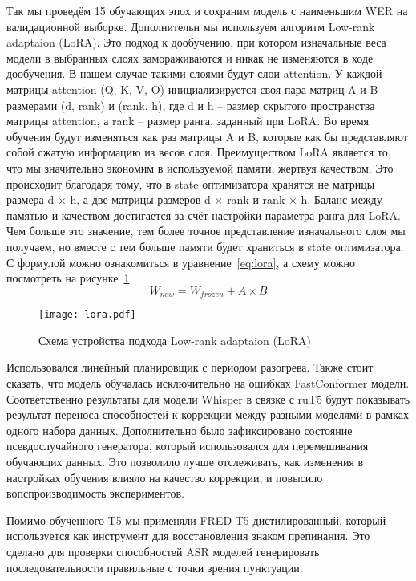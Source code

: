 Так мы проведём 15 обучающих эпох и сохраним модель с наименьшим WER на валидационной выборке.
Дополнительн мы используем алгоритм Low-rank adaptaion (LoRA)\cite{hu2022lora}.
Это подход к дообучению, при котором изначальные веса модели в выбранных слоях замораживаются и никак не изменяются в ходе дообучения.
В нашем случае такими слоями будут слои attention.
У каждой матрицы attention (Q, K, V, O) инициализируется своя пара матриц A и B размерами (d, rank) и (rank, h), где d и h – размер скрытого пространства матрицы attention, а rank – размер ранга, заданный при LoRA.
Во время обучения будут изменяться как раз матрицы A и B, которые как бы представляют собой сжатую информацию из весов слоя.
Преимуществом LoRA является то, что мы значительно экономим в используемой памяти, жертвуя качеством.
Это происходит благодаря тому, что в state оптимизатора хранятся не матрицы размера d $\times$ h, а две матрицы размеров d $\times$ rank и rank $\times$ h.
Баланс между памятью и качеством достигается за счёт настройки параметра ранга для LoRA.
Чем больше это значение, тем более точное представление изначального слоя мы получаем, но вместе с тем больше памяти будет храниться в state оптимизатора.
С формулой можно ознакомиться в уравнение~\ref{eq:lora}, а схему можно посмотреть на рисунке~\ref{fig:lora}:
\begin{equation}
  W_{new} = W_{frozen} + A \times B
  \label{eq:lora}
\end{equation}

\begin{figure}[!t]
  \centering
  \texttt{[image: lora.pdf]}
  \caption{Схема устройства подхода Low-rank adaptaion (LoRA)}
  \label{fig:lora}
\end{figure}

Использовался линейный планировщик с периодом разогрева.
Также стоит сказать, что модель обучалась исключительно на ошибках FastConformer модели.
Соответственно результаты для модели Whisper в связке с ruT5 будут показывать результат переноса способностей к коррекции между разными моделями в рамках одного набора данных.
Дополнительно было зафиксировано состояние псевдослучайного генератора, который использовался для перемешивания обучающих данных.
Это позволило лучше отслеживать, как изменения в настройках обучения влияло на качество коррекции, и повысило вопспроизводимость экспериментов.

Помимо обученного T5 мы применяли FRED-T5 дистилированный, который используется как инструмент для восстановления знаком препинания.
Это сделано для проверки способностей ASR моделей генерировать последовательности правильные с точки зрения пунктуации.

